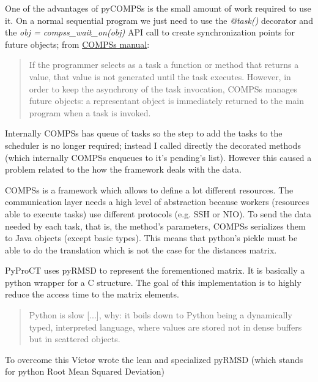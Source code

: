 One of the advantages of pyCOMPSs is the small amount of work required to use it. On a normal sequential program we just need to use the \textit{@task()} decorator and the \textit{obj = compss\_wait\_on(obj)} API call to create synchronization points for future objects; from \hyperref[sec:docs]{COMPSs manual}: 

\begin{quote} 
If the programmer selects as a task a function or method that returns a value, that value is not generated until the task executes. However, in order to keep the asynchrony of the task invocation, COMPSs manages future objects: a representant object is immediately returned to the main program when a task is invoked.
\end{quote}

Internally COMPSs has queue of tasks so the step to add the tasks to the scheduler is no longer required; instead I called directly the decorated methods (which internally COMPSs enqueues to it's pending's list). However this caused a problem related to the how the framework deals with the data.

COMPSs is a framework which allows to define a lot different resources. The communication layer needs a high level of abstraction because workers (resources able to execute tasks) use different protocols (e.g. SSH or NIO). To send the data needed by each task, that is, the method's parameters, COMPSs serializes them to Java objects (except basic types). This means that python's pickle must be able to do the translation which is not the case for the distances matrix.

PyProCT uses pyRMSD to represent the forementioned matrix. It is basically a python wrapper for a C structure. The goal of this implementation is to highly reduce the access time to the matrix elements. 
\begin{quote}
Python is slow [...], why: it boils down to Python being a dynamically typed, interpreted language, where values are stored not in dense buffers but in scattered objects. \cite{vanderplas_why_2014}
\end{quote}

To overcome this Víctor wrote the lean and specialized pyRMSD (which stands for python Root Mean Squared Deviation)






